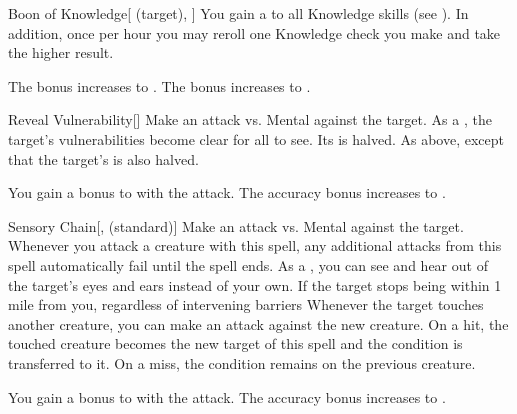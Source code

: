 \lowercase{\hypertarget{spell:Boon of Knowledge}{}}\label{spell:Boon of Knowledge}
\begin{attuneability}[Rank 4]{\hypertarget{spell:Boon of Knowledge}{Boon of Knowledge}}[ (target), ]
You gain a   to all Knowledge skills (see ).
In addition, once per hour you may reroll one Knowledge check you make and take the higher result.

\rankline
{} The bonus increases to .
 The bonus increases to .
\end{attuneability}
\vspace{0.25em}



\lowercase{\hypertarget{spell:Reveal Vulnerability}{}}\label{spell:Reveal Vulnerability}
\begin{freeability}[Rank 4]{\hypertarget{spell:Reveal Vulnerability}{Reveal Vulnerability}}[]
Make an attack vs. Mental against the target.
\hit As a , the target's vulnerabilities become clear for all to see.
Its  is halved.
\crit As above, except that the target's  is also halved.

\rankline
{} You gain a  bonus to  with the attack.
 The accuracy bonus increases to .
\end{freeability}
\vspace{0.25em}



\lowercase{\hypertarget{spell:Sensory Chain}{}}\label{spell:Sensory Chain}
\begin{freeability}[Rank 4]{\hypertarget{spell:Sensory Chain}{Sensory Chain}}[,  (standard)]
Make an attack vs. Mental against the target.
Whenever you attack a creature with this spell, any additional attacks from this spell automatically fail until the spell ends.
\hit As a , you can see and hear out of the target's eyes and ears instead of your own.
If the target stops being within 1 mile from you, regardless of intervening barriers
Whenever the target touches another creature, you can make an attack against the new creature.
On a hit, the touched creature becomes the new target of this spell and the condition is transferred to it.
On a miss, the condition remains on the previous creature.


\rankline
{} You gain a  bonus to  with the attack.
 The accuracy bonus increases to .
\end{freeability}
\vspace{0.25em}



